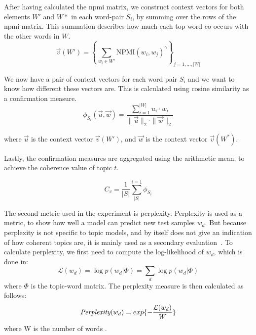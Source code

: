 After having calculated the \gls{npmi} matrix, we construct context vectors for both elements $W'$ and $W*$ in each word-pair $S_i$, by summing over the rows of the \gls{npmi} matrix.
This summation describes how much each top word co-occurs with the other words in $W$.
\begin{equation}\label{eq:coherence_1}
	\overrightarrow{v}(W') = \left\{ \sum_{w_i \in W'} \text{NPMI}(w_i, w_j)^{\gamma} \right\}_{j=1,\dots,|W|}
\end{equation}

We now have a pair of context vectors for each word pair $S_i$ and we want to know how different these vectors are.
This is calculated using cosine similarity as a confirmation measure.
\begin{equation}\label{eq:coherence_3}
	\phi_{S_i}(\overrightarrow{u}, \overrightarrow{w}) = \frac
	{\sum_{i = 1}^{|W|} u_i \cdot w_i}
	{\|\overrightarrow{u}\|_2 \cdot \|\overrightarrow{w}\|_2}
\end{equation}

\noindent where $\overrightarrow{u}$ is the context vector $\overrightarrow{v}(W')$, and $\overrightarrow{w}$ is the context vector $\overrightarrow{v}(W^*)$.

Lastly, the confirmation measures are aggregated using the arithmetic mean, to achieve the coherence value of topic $t$.

\begin{equation}\label{eq:coherence_4}
	C_v = \frac{1}{|S|}\sum_{|S|}^{i=1}\phi_{S_i}
\end{equation}

The second metric used in the experiment is perplexity.
Perplexity is used as a metric, to show how well a model can predict new test samples $w_d$.
But because perplexity is not specific to topic models, and by itself does not give an indication of how coherent topics are, it is mainly used as a secondary evaluation~\cite{tea_leaves}.
To calculate perplexity, we first need to compute the log-likelihood of $w_d$, which is done in:
\begin{equation}\label{eq:likelihood}
	\mathcal{L}(w_d) = \log p(w_d|\Phi) = \sum_{d} \log p(w_d|\Phi)
\end{equation}
\noindent where $\Phi$ is the topic-word matrix.
The perplexity measure is then calculated as follows:
\begin{equation}
	\emph{Perplexity}(w_d) = exp \{-\frac{\mathcal{L}(w_d)}{W}\}
\end{equation}
\noindent where W is the number of words \cite{de2008evaluating}.

